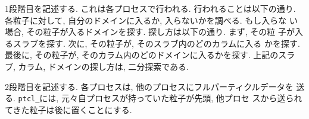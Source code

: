 
1段階目を記述する. これは各プロセスで行われる. 行われることは以下の通り.
各粒子に対して, 自分のドメインに入るか, 入らないかを調べる. もし入らな
い場合, その粒子が入るドメインを探す. 探し方は以下の通り. まず, その粒
子が入るスラブを探す. 次に, その粒子が, そのスラブ内のどのカラムに入る
かを探す. 最後に, その粒子が, そのカラム内のどのドメインに入るかを探す.
上記のスラブ, カラム, ドメインの探し方は, 二分探索である.


2段階目を記述する. 各プロセスは, 他のプロセスにフルパーティクルデータを
送る. {\tt ptcl\_}には, 元々自プロセスが持っていた粒子が先頭, 他プロセ
スから送られてきた粒子は後に置くことにする.



